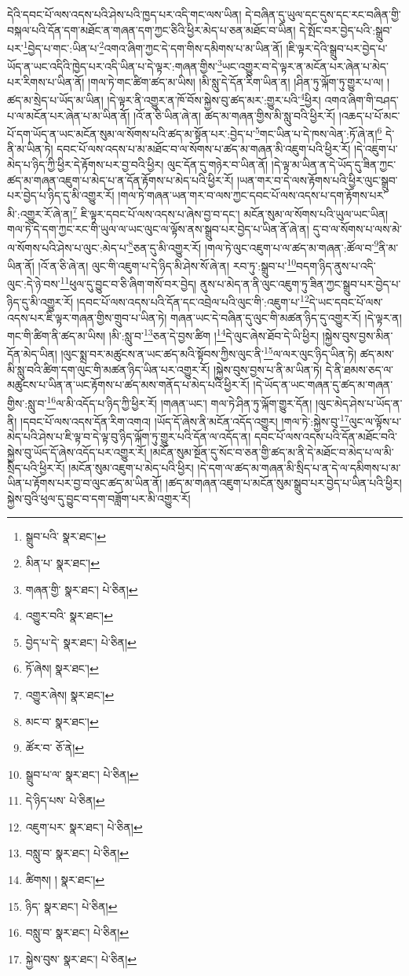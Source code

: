 དེའི་དབང་པོ་ལས་འདས་པའི་ཤེས་པའི་ཁྱད་པར་འདི་གང་ལས་ཡིན། དེ་བཞིན་དུ་ཡུལ་དང་དུས་དང་རང་བཞིན་གྱི་བསྐལ་པའི་དོན་དག་མཐོང་ན་གཞན་དག་ཀྱང་ཅིའི་ཕྱིར་མེད་པ་ཅན་མཐོང་བ་ཡིན། དེ་སྤོང་བར་བྱེད་པའི་:སྒྲུབ་པར་\footnote{སྒྲུབ་པའི་  སྣར་ཐང་། }བྱེད་པ་གང་:ཡིན་པ་\footnote{མིན་པ་  སྣར་ཐང་། }འགའ་ཞིག་ཀྱང་དེ་དག་གིས་དམིགས་པ་མ་ཡིན་ནོ། །ཇི་ལྟར་དེའི་སྒྲུབ་པར་བྱེད་པ་ཡོད་ན་ཡང་འདིའི་ཁྱེད་པར་འདི་ཡིན་པ་དེ་ལྟར་:གཞན་གྱིས་\footnote{གཞན་གྱི་  སྣར་ཐང་།  པེ་ཅིན། }ཡང་འགྱུར་བ་དེ་ལྟར་ན་མངོན་པར་ཞེན་པ་མེད་པར་རིགས་པ་ཡིན་ནོ། །གལ་ཏེ་གང་ཚིག་ཚད་མ་ཡིས། །མི་སླུ་དེ་དོན་རིག་ཡིན་ན། །ཤིན་ཏུ་ལྐོག་ཏུ་གྱུར་པ་ལ། །ཚད་མ་སྲེད་པ་ཡོད་མ་ཡིན། །དེ་ལྟར་ནི་འགྱུར་ན་ཁོ་བོས་སྐྱེས་བུ་ཚད་མར་:གྱུར་པའི་\footnote{འགྱུར་བའི་  སྣར་ཐང་། }ཕྱིར། འགའ་ཞིག་གི་བཤད་པ་ལ་མངོན་པར་ཞེན་པ་མ་ཡིན་ནོ། །འོ་ན་ཅི་ཡིན་ཞེ་ན། ཚད་མ་གཞན་གྱིས་མི་སླུ་བའི་ཕྱིར་རོ། །འཆད་པ་པོ་མང་པོ་དག་ཡོད་ན་ཡང་མངོན་སུམ་ལ་སོགས་པའི་ཚད་མ་སྟོན་པར་:བྱེད་པ་\footnote{བྱེད་པ་དེ་  སྣར་ཐང་།  པེ་ཅིན། }གང་ཡིན་པ་དེ་ཁས་ལེན་:ཏོ་ཞེ་ན།\footnote{ཏོ་ཞེས།  སྣར་ཐང་། } དེ་ནི་མ་ཡིན་ཏེ། དབང་པོ་ལས་འདས་པ་མ་མཐོང་བ་ལ་སོགས་པ་ཚད་མ་གཞན་མི་འཇུག་པའི་ཕྱིར་རོ། །དེ་འཇུག་པ་མེད་པ་ཉིད་ཀྱི་ཕྱིར་དེ་རྟོགས་པར་བྱ་བའི་ཕྱིར། ལུང་དོན་དུ་གཉེར་བ་ཡིན་ནོ། །དེ་ལྟ་མ་ཡིན་ན་དེ་ཡོད་དུ་ཟིན་ཀྱང་ཚད་མ་གཞན་འཇུག་པ་མེད་པ་ན་དོན་རྟོགས་པ་མེད་པའི་ཕྱིར་རོ། །ཡན་གར་བ་དེ་ལས་རྟོགས་པའི་ཕྱིར་ལུང་སྒྲུབ་པར་བྱེད་པ་ཉིད་དུ་མི་འགྱུར་རོ། །གལ་ཏེ་གཞན་ཡན་གར་བ་ལས་ཀྱང་དབང་པོ་ལས་འདས་པ་དག་རྟོགས་པར་མི་:འགྱུར་རོ་ཞེ་ན།\footnote{འགྱུར་ཞེས།  སྣར་ཐང་། } ཇི་ལྟར་དབང་པོ་ལས་འདས་པ་ཞེས་བྱ་བ་དང་། མངོན་སུམ་ལ་སོགས་པའི་ཡུལ་ཡང་ཡིན། གལ་ཏེ་དེ་དག་ཀྱང་རང་གི་ཡུལ་ལ་ཡང་ལུང་ལ་ལྟོས་ནས་སྒྲུབ་པར་བྱེད་པ་ཡིན་ནོ་ཞེ་ན། དུ་བ་ལ་སོགས་པ་ལས་མེ་ལ་སོགས་པའི་ཤེས་པ་ལུང་:མེད་པ་\footnote{མང་བ་  སྣར་ཐང་། }ཅན་དུ་མི་འགྱུར་རོ། །གལ་ཏེ་ལུང་འཇུག་པ་ལ་ཚད་མ་གཞན་:ཚོལ་བ་\footnote{ཚོར་བ་  ཅོ་ནེ། }ནི་མ་ཡིན་ནོ། །འོ་ན་ཅི་ཞེ་ན། ལུང་གི་འཇུག་པ་དེ་ཉིད་མི་ཤེས་སོ་ཞེ་ན། རབ་ཏུ་:སྒྲུབ་པ་\footnote{སྒྲུབ་པ་ལ་  སྣར་ཐང་།  པེ་ཅིན། }བདག་ཉིད་ནུས་པ་འདི་ལུང་:དེ་ཉེ་བས་\footnote{དེ་ཉིད་པས་  པེ་ཅིན། }ཕུལ་དུ་བྱུང་བ་ཅི་ཞིག་གསོ་བར་བྱེད། ནུས་པ་མེད་ན་ནི་ལུང་འཇུག་ཏུ་ཟིན་ཀྱང་སྒྲུབ་པར་བྱེད་པ་ཉིད་དུ་མི་འགྱུར་རོ། །དབང་པོ་ལས་འདས་པའི་དོན་དང་འབྲེལ་པའི་ལུང་གི་:འཇུག་པ་\footnote{འཇུག་པར་  སྣར་ཐང་།  པེ་ཅིན། }དེ་ཡང་དབང་པོ་ལས་འདས་པར་ཇི་ལྟར་གཞན་གྱིས་གྲུབ་པ་ཡིན་ཏེ། གཞན་ཡང་དེ་བཞིན་དུ་ལུང་གི་མཚན་ཉིད་དུ་འགྱུར་རོ། །དེ་ལྟར་ན། གང་གི་ཚིག་ནི་ཚད་མ་ཡིས། །མི་:སླུ་བ་\footnote{བསླུ་བ་  སྣར་ཐང་།  པེ་ཅིན། }ཅན་དེ་བྱས་ཚིག །\footnote{ཚིགས། །  སྣར་ཐང་། }དེ་ལུང་ཞེས་ཐོབ་དེ་ཡི་ཕྱིར། །སྐྱེས་བུས་བྱས་མིན་དོན་མེད་ཡིན། །ལུང་སྨྲ་བར་མཚུངས་ན་ཡང་ཚད་མའི་སྟོབས་ཀྱིས་ལུང་ནི་\footnote{ཉིད་  སྣར་ཐང་།  པེ་ཅིན། }ལ་ལར་ལུང་ཉིད་ཡིན་ཏེ། ཚད་མས་མི་སླུ་བའི་ཚིག་དག་ལུང་གི་མཚན་ཉིད་ཡིན་པར་འགྱུར་རོ། །སྐྱེས་བུས་བྱས་པ་ནི་མ་ཡིན་ཏེ། དེ་ནི་ཐམས་ཅད་ལ་མཚུངས་པ་ཡིན་ན་ཡང་རྟོགས་པ་ཚད་མས་གནོད་པ་མེད་པའི་ཕྱིར་རོ། །དེ་ཡོད་ན་ཡང་གཞན་དུ་ཚད་མ་གཞན་གྱིས་:སླུ་བ་\footnote{བསླུ་བ་  སྣར་ཐང་།  པེ་ཅིན། }ལ་མི་འདོད་པ་ཉིད་ཀྱི་ཕྱིར་རོ། །གཞན་ཡང་། གལ་ཏེ་ཤིན་ཏུ་ལྐོག་གྱུར་དོན། །ལུང་མེད་ཤེས་པ་ཡོད་ན་ནི། །དབང་པོ་ལས་འདས་དོན་རིག་འགའ། །ཡོད་དོ་ཞེས་ནི་མངོན་འདོད་འགྱུར། །གལ་ཏེ་:སྐྱེས་བུ་\footnote{སྐྱེས་བུས་  སྣར་ཐང་།  པེ་ཅིན། }ལུང་ལ་ལྟོས་པ་མེད་པའི་ཤེས་པ་ཇི་ལྟ་བ་དེ་ལྟ་བུ་ཉིད་ལྐོག་ཏུ་གྱུར་པའི་དོན་ལ་འདོད་ན། དབང་པོ་ལས་འདས་པའི་དོན་མཐོང་བའི་སྐྱེས་བུ་ཡོད་དོ་ཞེས་འདོད་པར་འགྱུར་རོ། །མངོན་སུམ་སྔོན་དུ་སོང་བ་ཅན་གྱི་ཚད་མ་ནི་དེ་མཐོང་བ་མེད་པ་ལ་མི་སྲིད་པའི་ཕྱིར་རོ། །མངོན་སུམ་འཇུག་པ་མེད་པའི་ཕྱིར། །དེ་དག་ལ་ཚད་མ་གཞན་མི་སྲིད་པ་ན་དེ་ལ་དམིགས་པ་མ་ཡིན་པ་རྟོགས་པར་བྱ་བ་ལུང་ཚད་མ་ཡིན་ནོ། །ཚད་མ་གཞན་འཇུག་པ་མངོན་སུམ་སྒྲུབ་པར་བྱེད་པ་ཡིན་པའི་ཕྱིར། སྐྱེས་བུའི་ཕུལ་དུ་བྱུང་བ་དག་བཟློག་པར་མི་འགྱུར་རོ། 